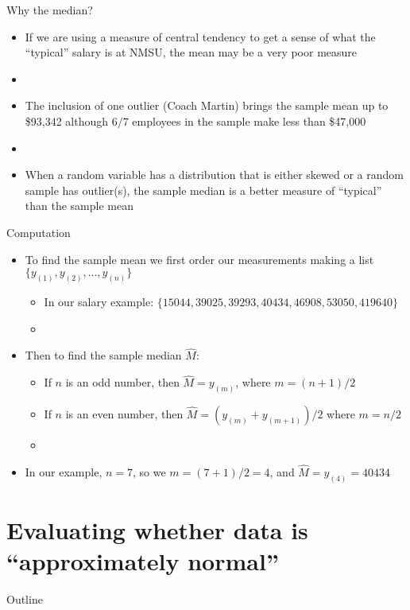 \documentclass[xcolor=dvipsnames]{beamer}
\begin{document}
\begin{frame}{Why the median?}
	\begin{itemize}
		\item If we are using a measure of central tendency to get a sense of what the ``typical'' salary is at NMSU, the mean may be a very poor measure \pause
		\item[]
		\item The inclusion of one outlier (Coach Martin) brings the sample mean up to \$93,342 although $6/7$ employees in the sample make less than \$47,000 \pause
		\item[]
		\item When a random variable has a distribution that is either skewed or a random sample has outlier(s), the sample median is a better measure of ``typical'' than the sample mean 
	\end{itemize}
\end{frame}

\begin{frame}{Computation}
	\begin{itemize}
		\item To find the sample mean we first order our measurements making a list $\{y_{(1)}, y_{(2)}, \hdots, y_{(n)} \}$ \pause
		\begin{itemize}
			\item In our salary example: $\{15044, 39025, 39293, 40434, 46908, 53050, 419640\}$ \pause
			\item[]
		\end{itemize}
		\item Then to find the sample median $\hat{M}$: \pause
		\begin{itemize}
			\item If $n$ is an odd number, then $\hat{M} = y_{(m)}$, where $m = (n+1)/2$ \pause
			\item If $n$ is an even number, then $\hat{M} = (y_{(m)} + y_{(m+1)})/2$ where $m = n/2$ \pause
			\item[]
		\end{itemize}
		\item In our example, $n = 7$, so we $m = (7+1)/2 = 4$, and $\hat{M} = y_{(4)} = 40434$
	\end{itemize}
\end{frame}

\section{Evaluating whether data is ``approximately normal''}
\begin{frame}{Outline}
\tableofcontents[currentsection,subsectionstyle=show/shaded/hide]
\end{frame}
\end{document}
